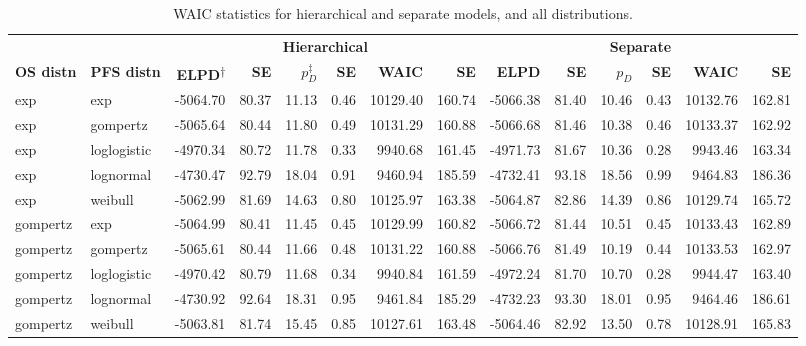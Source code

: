 \documentclass[AMA,STIX1COL]{WileyNJD-v2}
\begin{document}
\begin{center}
\begin{table}[t]
\caption{WAIC statistics for hierarchical and separate models, and all distributions. \label{tab:waic}}
\begin{tabular}{llrrrrrrrrrrrr}
\toprule
\multicolumn{1}{l}{} & \multicolumn{1}{l}{} & \multicolumn{6}{c}{\textbf{Hierarchical}} & \multicolumn{6}{c}{\textbf{Separate}}\\
\cmidrule{3-8}\cmidrule{5-6}\cmidrule{9-14}
\textbf{OS distn} & \textbf{PFS distn} & \textbf{ELPD\textsuperscript{$\dagger$}} & \textbf{SE} & \textbf{$p_D^{\ddagger}$} & \textbf{SE} & \textbf{WAIC} & \textbf{SE} & \textbf{ELPD} & \textbf{SE} & $p_D$ & \textbf{SE} & \textbf{WAIC} & \textbf{SE}\\
\midrule
exp & exp & -5064.70 & 80.37 & 11.13 & 0.46 & 10129.40 & 160.74 & -5066.38 & 81.40 & 10.46 & 0.43 & 10132.76 & 162.81\\
exp & gompertz & -5065.64 & 80.44 & 11.80 & 0.49 & 10131.29 & 160.88 & -5066.68 & 81.46 & 10.38 & 0.46 & 10133.37 & 162.92\\
exp & loglogistic & -4970.34 & 80.72 & 11.78 & 0.33 & 9940.68 & 161.45 & -4971.73 & 81.67 & 10.36 & 0.28 & 9943.46 & 163.34\\
exp & lognormal & -4730.47 & 92.79 & 18.04 & 0.91 & 9460.94 & 185.59 & -4732.41 & 93.18 & 18.56 & 0.99 & 9464.83 & 186.36\\
exp & weibull & -5062.99 & 81.69 & 14.63 & 0.80 & 10125.97 & 163.38 & -5064.87 & 82.86 & 14.39 & 0.86 & 10129.74 & 165.72\\
gompertz & exp & -5064.99 & 80.41 & 11.45 & 0.45 & 10129.99 & 160.82 & -5066.72 & 81.44 & 10.51 & 0.45 & 10133.43 & 162.89\\
gompertz & gompertz & -5065.61 & 80.44 & 11.66 & 0.48 & 10131.22 & 160.88 & -5066.76 & 81.49 & 10.19 & 0.44 & 10133.53 & 162.97\\
gompertz & loglogistic & -4970.42 & 80.79 & 11.68 & 0.34 & 9940.84 & 161.59 & -4972.24 & 81.70 & 10.70 & 0.28 & 9944.47 & 163.40\\
gompertz & lognormal & -4730.92 & 92.64 & 18.31 & 0.95 & 9461.84 & 185.29 & -4732.23 & 93.30 & 18.01 & 0.95 & 9464.46 & 186.61\\
gompertz & weibull & -5063.81 & 81.74 & 15.45 & 0.85 & 10127.61 & 163.48 & -5064.46 & 82.92 & 13.50 & 0.78 & 10128.91 & 165.83\\

\end{tabular}
\end{table}
\end{center}
\end{document}
